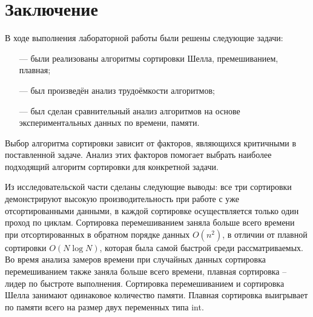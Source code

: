\chapter*{Заключение}

В ходе выполнения лабораторной работы были решены следующие задачи:

\begin{itemize}
	\item[---] были реализованы алгоритмы сортировки Шелла, премешиванием, плавная;
	\item[---] был произведён анализ трудоёмкости алгоритмов;
	\item[---] был сделан сравнительный анализ алгоритмов на основе экспериментальных данных по времени, памяти.
\end{itemize}


Выбор алгоритма сортировки зависит от факторов, являющихся критичными в поставленной задаче. Анализ этих факторов помогает выбрать наиболее подходящий алгоритм сортировки для конкретной задачи.


Из исследовательской части сделаны следующие выводы: все три сортировки демонстрируют высокую производительность при работе с уже отсортированными данными, в каждой сортировке осуществляется только один проход по циклам. Сортировка перемешиванием заняла больше всего времени при отсортированных в обратном порядке данных $O(n^2)$, в отличии от плавной сортировки $O(N\log{N})$, которая была самой быстрой среди рассматриваемых. Во время анализа замеров времени при случайных данных сортировка перемешиванием также заняла больше всего времени, плавная сортировка -- лидер по быстроте выполнения. Сортировка перемешиванием и сортировка Шелла занимают одинаковое количество памяти. Плавная сортировка выигрывает по памяти всего на размер двух переменных типа int.